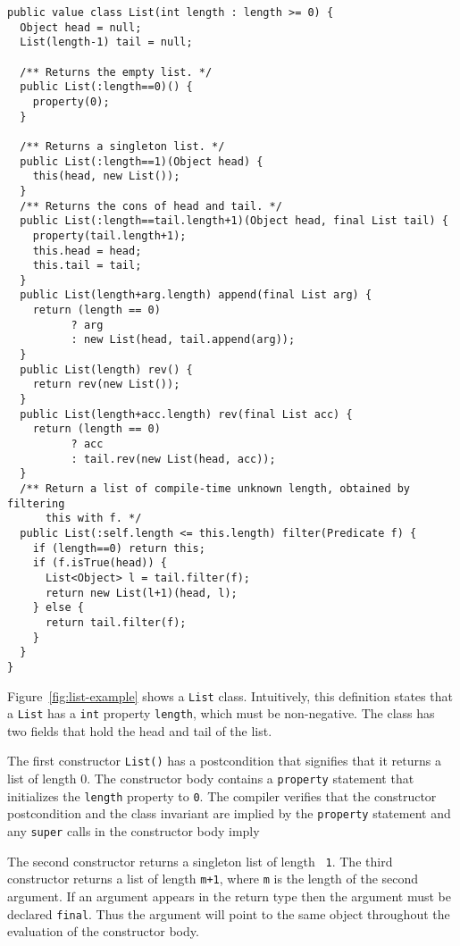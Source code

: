 \documentclass[nocopyrightspace,preprint,9pt]{sigplanconf}
\begin{document}
\begin{figure*}
{\footnotesize
\begin{verbatim}
public value class List(int length : length >= 0) {
  Object head = null;
  List(length-1) tail = null;

  /** Returns the empty list. */
  public List(:length==0)() {
    property(0);
  }

  /** Returns a singleton list. */
  public List(:length==1)(Object head) {
    this(head, new List());
  }
  /** Returns the cons of head and tail. */
  public List(:length==tail.length+1)(Object head, final List tail) {
    property(tail.length+1);
    this.head = head;
    this.tail = tail;
  }
  public List(length+arg.length) append(final List arg) {
    return (length == 0)
          ? arg
          : new List(head, tail.append(arg));
  }
  public List(length) rev() {
    return rev(new List());
  }
  public List(length+acc.length) rev(final List acc) {
    return (length == 0)
          ? acc
          : tail.rev(new List(head, acc));
  }
  /** Return a list of compile-time unknown length, obtained by filtering
      this with f. */
  public List(:self.length <= this.length) filter(Predicate f) {
    if (length==0) return this;
    if (f.isTrue(head)) {
      List<Object> l = tail.filter(f);
      return new List(l+1)(head, l);
    } else {
      return tail.filter(f);
    }
  }
}
\end{verbatim}}
\caption{List example}
\label{fig:list-example}
\end{figure*}

Figure~\ref{fig:list-example} shows a {\tt List} class.
Intuitively, this definition states that a {\tt List} has a {\tt int}
property {\tt length}, which must be non-negative.  The
class has two fields that hold the head and tail of the list.

The first constructor {\tt List()} has a postcondition that
signifies that it returns a list of length 0.
The constructor body contains a {\tt property} statement
that initializes the {\tt length} property to {\tt 0}.
The compiler verifies that
the constructor postcondition and the class invariant
are implied by the {\tt property} statement
and any {\tt super} calls in the constructor body imply

The 
second constructor returns a singleton list of length {\tt
1}. The third constructor returns a list of length {\tt m+1}, where
{\tt m} is the length of the second argument. 
If an argument appears in the return type then the argument must be
declared {\tt final}. Thus the argument will point to the same object
throughout the evaluation of the constructor body.
\end{document}
